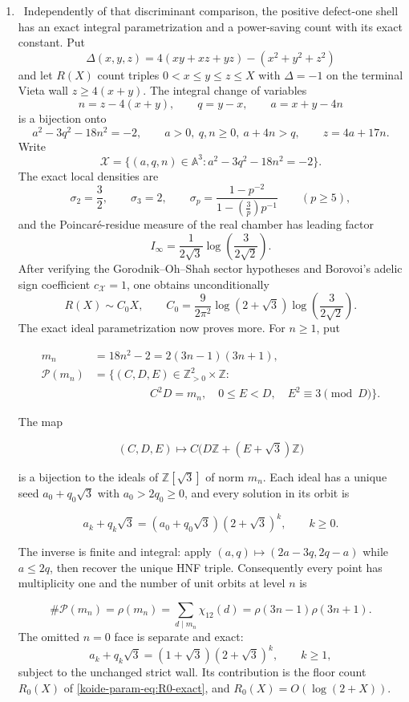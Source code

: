 \begin{enumerate}[leftmargin=1.8em]
\item \Verified\ Independently of that discriminant comparison, the positive
defect-one shell has an exact integral parametrization and a power-saving
count with its exact constant.  Put
\[
 \Delta(x,y,z)=4(xy+xz+yz)-(x^2+y^2+z^2)
\]
and let \(R(X)\) count triples
\(0<x\le y\le z\le X\) with \(\Delta=-1\) on the terminal Vieta wall
\(z\ge4(x+y)\).  The integral change of variables
\[
 n=z-4(x+y),\qquad q=y-x,\qquad a=x+y-4n
\]
is a bijection onto
\[
 a^2-3q^2-18n^2=-2,\qquad
 a>0,\ q,n\ge0,\ a+4n>q,\qquad z=4a+17n.
\]
Write
\[
 \mathscr X=\{(a,q,n)\in\mathbb A^3:
                 a^2-3q^2-18n^2=-2\}.
\]
The exact local densities are
\[
 \sigma_2=\frac32,\qquad \sigma_3=2,\qquad
 \sigma_p=\frac{1-p^{-2}}{1-(\frac3p)p^{-1}}\qquad(p\ge5),
\]
and the Poincar\'e-residue measure of the real chamber has leading factor
\[
 I_\infty=\frac1{2\sqrt3}\log\!\left(\frac3{2\sqrt2}\right).
\]
After verifying the Gorodnik--Oh--Shah sector hypotheses and Borovoi's
adelic sign coefficient \(c_{\mathscr X}=1\), one obtains unconditionally
\[
 R(X)\sim C_0X,\qquad
 C_0=\frac9{2\pi^2}\log(2+\sqrt3)
       \log\!\left(\frac3{2\sqrt2}\right).
\]
The exact ideal parametrization now proves more.  For \(n\geq1\), put

\[
\begin{aligned}
 m_n&=18n^2-2=2(3n-1)(3n+1),\\
 \mathcal P(m_n)&=\bigl\{(C,D,E)\in\mathbb Z_{>0}^2\times\mathbb Z:\\
 &\hspace{5em}C^2D=m_n,\quad 0\leq E<D,\quad
 E^2\equiv3\pmod D\bigr\}.
\end{aligned}
\]

The map

\[
 (C,D,E)\longmapsto
 C\bigl(D\mathbb Z+(E+\sqrt3)\mathbb Z\bigr)
\]

is a bijection to the ideals of
\(\mathbb Z[\sqrt3]\) of norm \(m_n\).  Each ideal has a unique seed
\(a_0+q_0\sqrt3\) with \(a_0>2q_0\geq0\), and every solution in its orbit is

\[
 a_k+q_k\sqrt3=(a_0+q_0\sqrt3)(2+\sqrt3)^k,\qquad k\geq0.
\]

The inverse is finite and integral: apply
\((a,q)\mapsto(2a-3q,2q-a)\) while \(a\leq2q\), then recover the unique HNF
triple.  Consequently every point has multiplicity one and the number of
unit orbits at level \(n\) is

\[
 \#\mathcal P(m_n)=\rho(m_n)
 =\sum_{d\mid m_n}\chi_{12}(d)
 =\rho(3n-1)\rho(3n+1).
\]
The omitted \(n=0\) face is separate and exact:
\[
 a_k+q_k\sqrt3=(1+\sqrt3)(2+\sqrt3)^k,\qquad k\geq1,
\]
subject to the unchanged strict wall.  Its contribution is the floor count
\(R_0(X)\) of \cref{koide-param-eq:R0-exact}, and
\(R_0(X)=O(\log(2+X))\).


\end{enumerate}
